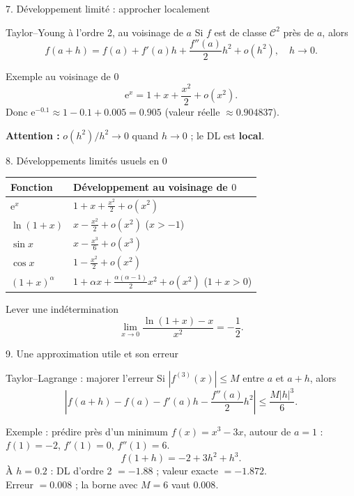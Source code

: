 \documentclass[aspectratio=169,11pt]{beamer}
\newcommand{\e}{\mathrm e}
\begin{document}
\begin{frame}{7. Développement limité : approcher localement}
\begin{block}{Taylor--Young à l'ordre 2, au voisinage de $a$}
Si $f$ est de classe $\mathcal C^2$ près de $a$, alors
\[f(a+h)=f(a)+f'(a)h+\frac{f''(a)}{2}h^2+o(h^2),\quad h\to0.\]
\end{block}
\begin{exampleblock}{Exemple au voisinage de $0$}
\[\e^x=1+x+\frac{x^2}{2}+o(x^2).\]
Donc $\e^{-0.1}\approx1-0.1+0.005=0.905$ (valeur réelle $\approx0.904837$).
\end{exampleblock}
{\small\color{Corail}\textbf{Attention :} $o(h^2)/h^2\to0$ quand $h\to0$ ; le DL est \textbf{local}.}
\end{frame}

\begin{frame}{8. Développements limités usuels en $0$}
\begin{tabularx}{\textwidth}{@{}lX@{}}
\toprule
Fonction & Développement au voisinage de $0$\\
\midrule
$\e^x$ & $1+x+\frac{x^2}{2}+o(x^2)$\\[2mm]
$\ln(1+x)$ & $x-\frac{x^2}{2}+o(x^2)$ ($x>-1$)\\[2mm]
$\sin x$ & $x-\frac{x^3}{6}+o(x^3)$\\[2mm]
$\cos x$ & $1-\frac{x^2}{2}+o(x^2)$\\[2mm]
$(1+x)^\alpha$ & $1+\alpha x+\frac{\alpha(\alpha-1)}2x^2+o(x^2)$ ($1+x>0$)\\
\bottomrule
\end{tabularx}
\begin{exampleblock}{Lever une indétermination}
\[\lim_{x\to0}\frac{\ln(1+x)-x}{x^2}=-\frac12.\]
\end{exampleblock}
\end{frame}

\begin{frame}{9. Une approximation utile et son erreur}
\begin{block}{Taylor--Lagrange : majorer l'erreur}
Si $|f^{(3)}(x)|\le M$ entre $a$ et $a+h$, alors
\[\left|f(a+h)-f(a)-f'(a)h-\frac{f''(a)}{2}h^2\right|\le\frac{M|h|^3}{6}.\]
\end{block}
\begin{exampleblock}{Exemple : prédire près d'un minimum}
$f(x)=x^3-3x$, autour de $a=1$ : $f(1)=-2$, $f'(1)=0$, $f''(1)=6$.\\
\[f(1+h)=-2+3h^2+h^3.\]
À $h=0.2$ : DL d'ordre 2 $=-1.88$ ; valeur exacte $=-1.872$.\\
Erreur $=0.008$ ; la borne avec $M=6$ vaut $0.008$.
\end{exampleblock}
\end{frame}
\end{document}
